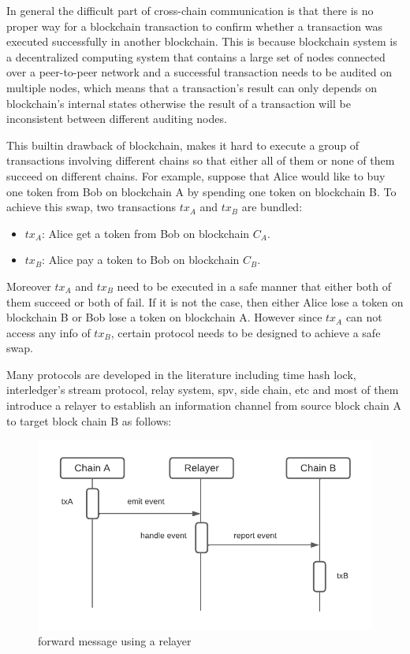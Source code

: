 \documentclass[pageno]{jpaper}
\begin{document}
In general the difficult part of cross-chain communication is that there is no proper way for a blockchain transaction to confirm whether a transaction was executed successfully in another blockchain. This is because blockchain system is a decentralized computing system that contains a large set of nodes connected over a peer-to-peer network and a successful transaction needs to be audited on multiple nodes, which means that a transaction's result can only depends on blockchain's internal states otherwise the result of a transaction will be inconsistent between different auditing nodes. 

This builtin drawback of blockchain, makes it hard to execute a group of transactions involving different chains so that either all of them or none of them succeed on different chains. For example, suppose that Alice would like to buy one token from Bob on blockchain A by spending one token on blockchain B. To achieve this swap, two transactions $tx_A$ and $tx_B$ are bundled:
\begin{itemize}[leftmargin=*]
\item $tx_A$: Alice get a token from Bob on blockchain $C_A$.
\item $tx_B$: Alice pay a token to Bob on blockchain $C_B$.
\end{itemize}
Moreover $tx_A$ and $tx_B$ need to be executed in a safe manner that either both of them succeed or both of fail. If it is not the case, then either Alice lose a token on blockchain B or Bob lose a token on blockchain A. However since $tx_A$ can not access any info of $tx_B$, certain protocol needs to be designed to achieve a safe swap.

Many protocols are developed in the literature including time hash lock, interledger’s stream protocol, relay system, spv, side chain, etc and most of them introduce a relayer to establish an information channel from source block chain A to target block chain B as follows:
\begin{figure}[h]
\caption{forward message using a relayer}
\label{relayer-connection}
\includegraphics[scale=0.6]{relayer}
\end{figure}
\end{document}
